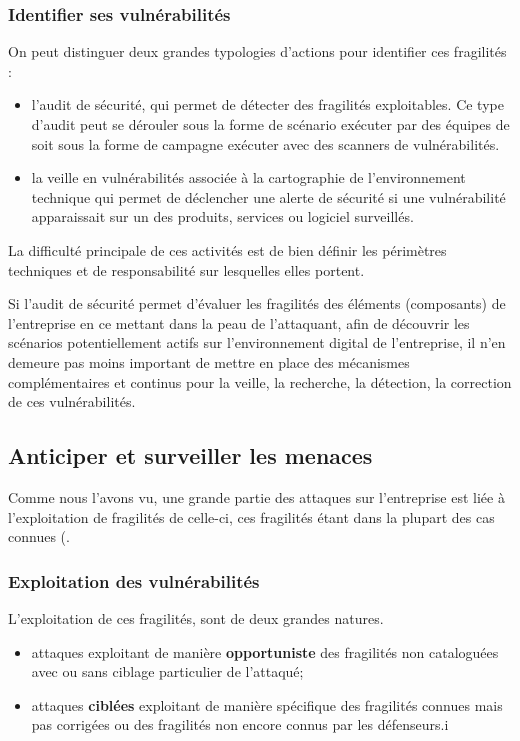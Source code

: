 \begin{frame}
\frametitle<presentation>{Identifier ses vulnérabilités}
On peut distinguer deux grandes typologies d'actions pour identifier ces fragilités :
\begin{itemize}
	\item l'audit de sécurité, qui permet de détecter des fragilités exploitables. Ce type d'audit peut se dérouler sous la forme de scénario exécuter par des équipes de  soit sous la forme de campagne exécuter avec des scanners de vulnérabilités.
	\item la veille en vulnérabilités associée à la cartographie de l'environnement technique qui permet de déclencher une alerte de sécurité si une vulnérabilité apparaissait sur un des produits, services ou logiciel surveillés.
\end{itemize}
\end{frame}

La difficulté principale de ces activités est de bien définir les périmètres techniques et de responsabilité sur lesquelles elles portent.

Si l'audit de sécurité permet d'évaluer les fragilités des éléments (composants) de l'entreprise en ce mettant dans la peau de l'attaquant, afin de découvrir les scénarios potentiellement actifs sur l'environnement digital de l'entreprise, il n'en demeure pas moins important de mettre en place des mécanismes complémentaires et continus pour la veille, la recherche, la détection, la correction de ces vulnérabilités.


\subsection{Anticiper et surveiller les menaces }

Comme nous l'avons vu, une grande partie des attaques sur l'entreprise est liée à l'exploitation de fragilités de celle-ci, ces fragilités étant dans la plupart des cas connues (. 

\begin{frame}
\frametitle<presentation>{Exploitation des vulnérabilités}
L'exploitation de ces fragilités, sont de deux grandes natures.
\begin{itemize}
	\item attaques exploitant de manière \textbf{opportuniste} des fragilités non cataloguées  avec ou sans ciblage particulier de l'attaqué;
	\item attaques \textbf{ciblées} exploitant de manière spécifique des fragilités connues mais pas corrigées ou des fragilités non encore connus par les défenseurs.i
\end{itemize}
\end{frame}

